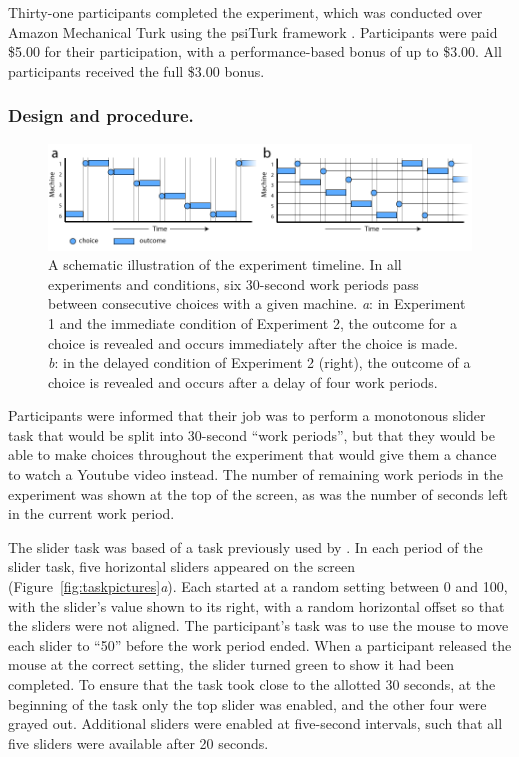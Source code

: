 \documentclass[10pt,letterpaper]{article}
\begin{document}
Thirty-one participants completed the experiment, which was conducted over
Amazon Mechanical Turk using the psiTurk framework \citep{Gureckis2015a}.
Participants were paid \$5.00 for their participation, with a performance-based
bonus of up to \$3.00. All participants received the full \$3.00 bonus.

\subsubsection{Design and procedure.}


\begin{figure}
\centering
\includegraphics[width=\textwidth]{figures/machinetimeline.png}
\caption{A schematic illustration of the experiment timeline. In all experiments
  and conditions, six 30-second work periods pass between consecutive choices
  with a given machine. \emph{a}: in Experiment 1 and the immediate condition of
  Experiment 2, the outcome for a choice is revealed and occurs immediately
  after the choice is made. \emph{b}: in the delayed condition of Experiment 2 (right),
  the outcome of a choice is revealed and occurs after a delay of four work
  periods.}
\label{fig:machinetimeline}
\end{figure}



Participants were informed that their job was to perform a monotonous slider task that
would be split into 30-second ``work periods'', but that they would be able to
make choices throughout the experiment that would give them a chance to watch a
Youtube video instead. The number of remaining work periods in the experiment was shown
at the top of the screen, as was the number of seconds left in the current work period.

The slider task was based of a task previously used by \citet{Gill2012}. In each
period of the slider task, five horizontal sliders appeared on the screen (Figure~\ref{fig:taskpictures}\emph{a}). Each
started at a random setting between 0 and 100, with the slider's value
shown to its right, with a random horizontal offset so that the
sliders were not aligned. The participant's task was to use the mouse to move
each slider to ``50'' before the work period ended. When a participant released
the mouse at the correct setting, the slider turned green to show it had been
completed. To ensure that the task took close to the allotted 30 seconds, at the
beginning of the task only the top slider was enabled, and the other four were
grayed out. Additional sliders were enabled at five-second intervals, such that
all five sliders were available after 20 seconds.
\end{document}
